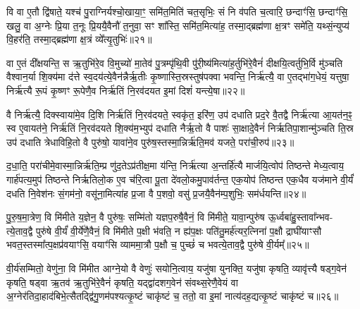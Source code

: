 {}

वि वा ए॒तौ द्वि॑षाते॒ यश्च॑ पु॒राग्निर्यश्चो॒खाया॒ꣳ॒ समि॑त॒मिति॑ चत॒सृभिः॒ सं नि व॑पति च॒त्वारि॒ छन्दाꣳ॑सि॒ छन्दाꣳ॑सि॒ खलु॒ वा अ॒ग्नेः प्रि॒या त॒नूः प्रि॒ययै॒वैनौ॑ त॒नुवा॒ सꣳ शा᳚स्ति॒ समि॑त॒मित्या॑ह॒ तस्मा॒द्ब्रह्म॑णा क्ष॒त्रꣳ समे॑ति॒ यथ्सं॒न्युप्य॑ वि॒हर॑ति॒ तस्मा॒द्ब्रह्म॑णा क्ष॒त्रं व्ये᳚त्यृ॒तुभिः॑॥२१॥

वा ए॒तं दी᳚क्षयन्ति॒ स ऋ॒तुभि॑रे॒व वि॒मुच्यो॑ मा॒तेव॑ पु॒त्रम्पृ॑थि॒वी पु॑री॒ष्य॑मित्या॑ह॒र्तुभि॑रे॒वैनं॑ दीक्षयि॒त्वर्तुभि॒र्वि मु॑ञ्चति वैश्वान॒र्या शि॒क्य॑मा द॑त्ते स्व॒दय॑त्ये॒वैन॑न्नैर्\mbox{}ऋ॒तीः कृ॒ष्णास्ति॒स्रस्तुष॑पक्वा भवन्ति॒ निर्\mbox{}ऋ॑त्यै॒ वा ए॒तद्भा॑ग॒धेयं॒ यत्तुषा॒ निर्\mbox{}ऋ॑त्यै रू॒पं कृ॒ष्णꣳ रू॒पेणै॒व निर्\mbox{}ऋ॑तिं नि॒रव॑दयत इ॒मां दिशं॑ यन्त्ये॒षा॥२२॥

वै निर्\mbox{}ऋ॑त्यै॒ दिक्स्वाया॑मे॒व दि॒शि निर्\mbox{}ऋ॑तिं नि॒रव॑दयते॒ स्वकृ॑त॒ इरि॑ण॒ उप॑ दधाति प्रद॒रे वै॒तद्वै निर्\mbox{}ऋ॑त्या आ॒यत॑न॒ꣴ॒ स्व ए॒वायत॑ने॒ निर्\mbox{}ऋ॑तिं नि॒रव॑दयते शि॒क्य॑म॒भ्युप॑ दधाति नैर्\mbox{}ऋ॒तो वै पाशः॑ सा॒क्षादे॒वैनं॑ निर्\mbox{}ऋतिपा॒शान्मु॑ञ्चति ति॒स्र उप॑ दधाति त्रेधाविहि॒तो वै पुरु॑षो॒ यावा॑ने॒व पुरु॑ष॒स्तस्मा॒न्निर्\mbox{}ऋ॑ति॒मव॑ यजते॒ परा॑ची॒रुप॑॥२३॥

द॒धा॒ति॒ परा॑चीमे॒वास्मा॒न्निर्\mbox{}ऋ॑ति॒म्प्र णु॑द॒ते\-ऽप्र॑तीक्ष॒मा य॑न्ति॒ निर्\mbox{}ऋ॑त्या अ॒न्तर्\mbox{}हि॑त्यै मार्जयि॒त्वोप॑ तिष्ठन्ते मेध्य॒त्वाय॒ गार्\mbox{}ह॑पत्य॒मुप॑ तिष्ठन्ते निर्\mbox{}ऋतिलो॒क ए॒व च॑रि॒त्वा पू॒ता दे॑वलो॒कमु॒पाव॑र्तन्त॒ एक॒योप॑ तिष्ठन्त एक॒धैव यज॑माने वी॒र्यं॑ दधति नि॒वेश॑नः सं॒गम॑नो॒ वसू॑ना॒मित्या॑ह प्र॒जा वै प॒शवो॒ वसु॑ प्र॒जयै॒वैन॑म्प॒शुभिः॒ सम॑र्धयन्ति॥२४॥

{\anuvakamend[{ऋ॒तुभि॑रे॒षा परा॑ची॒रुपा॒ष्टाच॑त्वारिꣳशच्च॥४॥}]}

पु॒रु॒ष॒मा॒त्रेण॒ वि मि॑मीते य॒ज्ञेन॒ वै पुरु॑षः॒ सम्मि॑तो यज्ञप॒रुषै॒वैनं॒ वि मि॑मीते॒ यावा॒न्पुरु॑ष ऊ॒र्ध्वबा॑हु॒स्तावा᳚न्भव- त्ये॒ताव॒द्वै पुरु॑षे वी॒र्यं॑ वी॒र्ये॑णै॒वैनं॒ वि मि॑मीते प॒क्षी भ॑वति॒ न ह्य॑प॒क्षः पति॑तु॒मर्\mbox{}ह॑त्यर॒त्निना॑ प॒क्षौ द्राघी॑याꣳसौ भवत॒स्तस्मा᳚त्प॒क्षप्र॑वयाꣳसि॒ वयाꣳ॑सि व्याममा॒त्रौ प॒क्षौ च॒ पुच्छं॑ च भवत्ये॒ताव॒द्वै पुरु॑षे वी॒र्यम्᳚॥२५॥

वी॒र्य॑सम्मितो॒ वेणु॑ना॒ वि मि॑मीत आग्ने॒यो वै वेणुः॑ सयोनि॒त्वाय॒ यजु॑षा युनक्ति॒ यजु॑षा कृषति॒ व्यावृ॑त्त्यै षड्ग॒वेन॑ कृषति॒ षड्वा ऋ॒तव॑ ऋ॒तुभि॑रे॒वैनं॑ कृषति॒ यद्द्वा॑दशग॒वेन॑ संवथ्स॒रेणै॒वेयं वा अ॒ग्नेर॑तिदा॒हाद॑बिभे॒त्सैतद्द्वि॑गु॒णम॑पश्यत्कृ॒ष्टं चाकृ॑ष्टं च॒ ततो॒ वा इ॒मां नात्य॑दह॒द्यत्कृ॒ष्टं चाकृ॑ष्टं च॥२६॥

